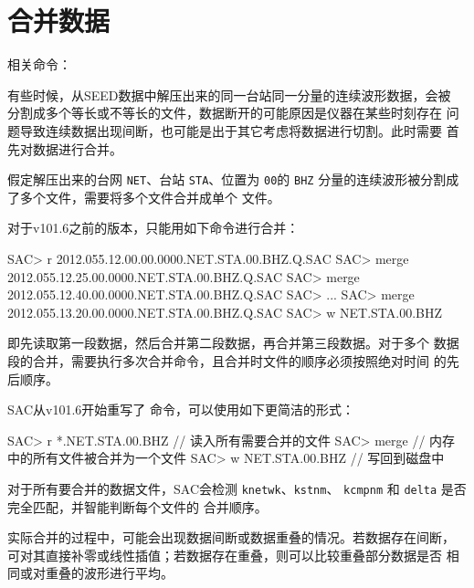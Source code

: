 \section{合并数据}
相关命令：

有些时候，从SEED数据中解压出来的同一台站同一分量的连续波形数据，会被
分割成多个等长或不等长的文件，数据断开的可能原因是仪器在某些时刻存在
问题导致连续数据出现间断，也可能是出于其它考虑将数据进行切割。此时需要
首先对数据进行合并。

假定解压出来的台网 \texttt{NET}、台站 \texttt{STA}、位置为 \texttt{00}的
\texttt{BHZ} 分量的连续波形被分割成了多个文件，需要将多个文件合并成单个
文件。

对于v101.6之前的版本，只能用如下命令进行合并：
\begin{SACCode}
SAC> r 2012.055.12.00.00.0000.NET.STA.00.BHZ.Q.SAC
SAC> merge 2012.055.12.25.00.0000.NET.STA.00.BHZ.Q.SAC
SAC> merge 2012.055.12.40.00.0000.NET.STA.00.BHZ.Q.SAC
SAC> ...
SAC> merge 2012.055.13.20.00.0000.NET.STA.00.BHZ.Q.SAC
SAC> w NET.STA.00.BHZ
\end{SACCode}
即先读取第一段数据，然后合并第二段数据，再合并第三段数据。对于多个
数据段的合并，需要执行多次合并命令，且合并时文件的顺序必须按照绝对时间
的先后顺序。

SAC从v101.6开始重写了  命令，可以使用如下更简洁的形式：
\begin{SACCode}
SAC> r *.NET.STA.00.BHZ        // 读入所有需要合并的文件
SAC> merge                     // 内存中的所有文件被合并为一个文件
SAC> w NET.STA.00.BHZ          // 写回到磁盘中
\end{SACCode}

对于所有要合并的数据文件，SAC会检测 \texttt{knetwk}、\texttt{kstnm}、
\texttt{kcmpnm} 和 \texttt{delta} 是否完全匹配，并智能判断每个文件的
合并顺序。

实际合并的过程中，可能会出现数据间断或数据重叠的情况。若数据存在间断，
可对其直接补零或线性插值；若数据存在重叠，则可以比较重叠部分数据是否
相同或对重叠的波形进行平均。
